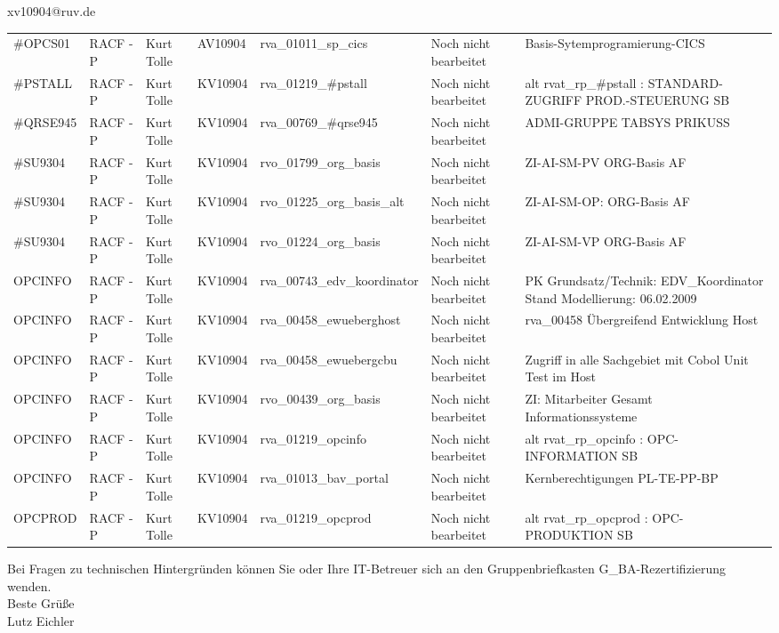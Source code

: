 \documentclass[a4paper,landscape,12pt]{letter}
\begin{document}
\begin{letter}{xv10904@ruv.de\hfill \break}
\begin{tiny}
\begin{longtable}{|p{35mm}|p{15mm}|p{25mm}|p{10mm}|p{40mm}|p{50mm}|p{50mm}|}
\#OPCS01 & RACF - P & Kurt Tolle & AV10904 & rva\_01011\_sp\_cics & Noch nicht bearbeitet & Basis-Sytemprogramierung-CICS \\
\#PSTALL & RACF - P & Kurt Tolle & KV10904 & rva\_01219\_\#pstall & Noch nicht bearbeitet & alt rvat\_rp\_\#pstall          : STANDARD-ZUGRIFF PROD.-STEUERUNG SB \\
\#QRSE945 & RACF - P & Kurt Tolle & KV10904 & rva\_00769\_\#qrse945 & Noch nicht bearbeitet & ADMI-GRUPPE TABSYS PRIKUSS \\
\#SU9304 & RACF - P & Kurt Tolle & KV10904 & rvo\_01799\_org\_basis & Noch nicht bearbeitet & ZI-AI-SM-PV ORG-Basis AF \\
\#SU9304 & RACF - P & Kurt Tolle & KV10904 & rvo\_01225\_org\_basis\_alt & Noch nicht bearbeitet & ZI-AI-SM-OP: ORG-Basis AF \\
\#SU9304 & RACF - P & Kurt Tolle & KV10904 & rvo\_01224\_org\_basis & Noch nicht bearbeitet & ZI-AI-SM-VP ORG-Basis AF \\
OPCINFO & RACF - P & Kurt Tolle & KV10904 & rva\_00743\_edv\_koordinator & Noch nicht bearbeitet & PK Grundsatz/Technik: EDV\_Koordinator Stand Modellierung: 06.02.2009 \\
OPCINFO & RACF - P & Kurt Tolle & KV10904 & rva\_00458\_ewueberghost & Noch nicht bearbeitet & rva\_00458 Übergreifend Entwicklung Host \\
OPCINFO & RACF - P & Kurt Tolle & KV10904 & rva\_00458\_ewuebergcbu & Noch nicht bearbeitet & Zugriff in alle Sachgebiet mit Cobol Unit Test im Host \\
OPCINFO & RACF - P & Kurt Tolle & KV10904 & rvo\_00439\_org\_basis & Noch nicht bearbeitet & ZI: Mitarbeiter Gesamt Informationssysteme \\
OPCINFO & RACF - P & Kurt Tolle & KV10904 & rva\_01219\_opcinfo & Noch nicht bearbeitet & alt rvat\_rp\_opcinfo          : OPC- INFORMATION                         SB \\
OPCINFO & RACF - P & Kurt Tolle & KV10904 & rva\_01013\_bav\_portal & Noch nicht bearbeitet & Kernberechtigungen PL-TE-PP-BP \\
OPCPROD & RACF - P & Kurt Tolle & KV10904 & rva\_01219\_opcprod & Noch nicht bearbeitet & alt rvat\_rp\_opcprod          : OPC-PRODUKTION                           SB \\

\hline
		\end{longtable}
		\end{tiny}
	
\begin{minipage}{\textwidth}
			Bei Fragen zu technischen Hintergründen können Sie 
			oder Ihre IT-Betreuer sich an den Gruppenbriefkasten 
			G\_BA-Rezertifizierung
			wenden.\\
			\linebreak
			Beste Grüße\\
			Lutz Eichler
	\end{minipage}
	\end{letter}
	
\end{document}
